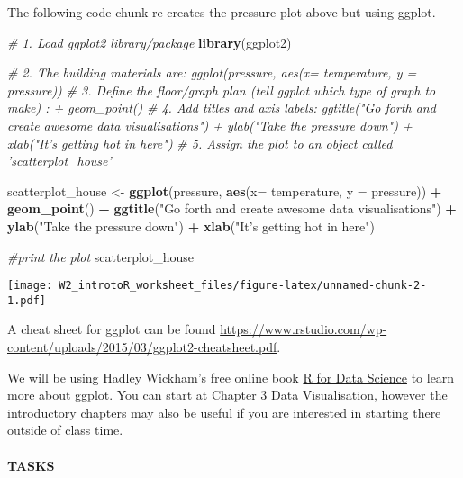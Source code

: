 \documentclass[]{article}
\newenvironment{Shaded}{\begin{snugshade}}{\end{snugshade}}
\newcommand{\CommentTok}[1]{\textcolor[rgb]{0.56,0.35,0.01}{\textit{#1}}}
\newcommand{\DataTypeTok}[1]{\textcolor[rgb]{0.13,0.29,0.53}{#1}}
\newcommand{\KeywordTok}[1]{\textcolor[rgb]{0.13,0.29,0.53}{\textbf{#1}}}
\newcommand{\NormalTok}[1]{#1}
\newcommand{\OperatorTok}[1]{\textcolor[rgb]{0.81,0.36,0.00}{\textbf{#1}}}
\newcommand{\StringTok}[1]{\textcolor[rgb]{0.31,0.60,0.02}{#1}}
\let\oldparagraph\paragraph
\renewcommand{\paragraph}[1]{\oldparagraph{#1}\mbox{}}
\begin{document}
The following code chunk re-creates the pressure plot above but using
ggplot.

\begin{Shaded}
\begin{Highlighting}[]
\CommentTok{# 1. Load ggplot2 library/package}
\KeywordTok{library}\NormalTok{(ggplot2)}

\CommentTok{# 2. The building materials are: ggplot(pressure, aes(x= temperature, y = pressure)) }
\CommentTok{# 3. Define the floor/graph plan (tell ggplot which type of graph to make) : + geom_point()}
\CommentTok{# 4. Add titles and axis labels: ggtitle("Go forth and create awesome data visualisations") + ylab("Take the pressure down") + xlab("It's getting hot in here")}
\CommentTok{# 5. Assign the plot to an object called 'scatterplot_house'}

\NormalTok{scatterplot_house <-}\StringTok{ }\KeywordTok{ggplot}\NormalTok{(pressure, }\KeywordTok{aes}\NormalTok{(}\DataTypeTok{x=}\NormalTok{ temperature, }\DataTypeTok{y =}\NormalTok{ pressure)) }\OperatorTok{+}\StringTok{ }\KeywordTok{geom_point}\NormalTok{() }\OperatorTok{+}\StringTok{ }\KeywordTok{ggtitle}\NormalTok{(}\StringTok{"Go forth and create awesome data visualisations"}\NormalTok{) }\OperatorTok{+}\StringTok{ }\KeywordTok{ylab}\NormalTok{(}\StringTok{"Take the pressure down"}\NormalTok{) }\OperatorTok{+}\StringTok{ }\KeywordTok{xlab}\NormalTok{(}\StringTok{"It's getting hot in here"}\NormalTok{)}

\CommentTok{#print the plot}
\NormalTok{scatterplot_house}
\end{Highlighting}
\end{Shaded}

\texttt{[image: W2\_introtoR\_worksheet\_files/figure-latex/unnamed-chunk-2-1.pdf]}

A cheat sheet for ggplot can be found
\url{https://www.rstudio.com/wp-content/uploads/2015/03/ggplot2-cheatsheet.pdf}.

We will be using Hadley Wickham's free online book
\href{https://r4ds.had.co.nz/.html}{R for Data Science} to learn more
about ggplot. You can start at Chapter 3 Data Visualisation, however the
introductory chapters may also be useful if you are interested in
starting there outside of class time.

\hypertarget{tasks}{%
\paragraph{TASKS}\label{tasks}}
\end{document}
